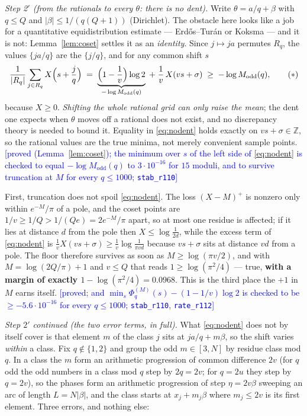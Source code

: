 \documentclass[11pt,a4paper]{article}
\theoremstyle{plain}
\theoremstyle{definition}
\theoremstyle{remark}
\newcommand{\STATUS}[1]{\textcolor{blue}{\textsf{[#1]}}}
\begin{document}
\emph{Step 2$'$ (from the rationals to every $\theta$: there is no dent).} Write
$\theta=a/q+\beta$ with $q\le Q$ and $|\beta|\le1/(q(Q+1))$ (Dirichlet). The obstacle here looks
like a job for a quantitative equidistribution estimate --- Erd\H{o}s--Tur\'an or Koksma --- and
it is not: Lemma~\ref{lem:coset} settles it as an \emph{identity}. Since $j\mapsto ja$ permutes
$R_q$, the values $\{ja/q\}$ are the $\{j/q\}$, and for any common shift $s$
\[
   \frac1{|R_q|}\sum_{j\in R_q}X\Bigl(s+\frac jq\Bigr)
   \;=\;\underbrace{\Bigl(1-\frac1v\Bigr)\log2}_{-\log M_{\mathrm{odd}}(q)}
   \;+\;\frac1v\,X(vs+\sigma)\;\ge\;-\log M_{\mathrm{odd}}(q),
   \tag{$\ast$}\label{eq:nodent}
\]
because $X\ge0$. \emph{Shifting the whole rational grid can only raise the mean}; the dent one
expects when $\theta$ moves off a rational does not exist, and no discrepancy theory is needed
to bound it. Equality in \eqref{eq:nodent} holds exactly on $vs+\sigma\in\mathbb Z$, so the
rational values are the true minima, not merely convenient sample points.
\STATUS{proved (Lemma~\ref{lem:coset}); the minimum over $s$ of the left side of
\eqref{eq:nodent} is checked to equal $-\log M_{\mathrm{odd}}(q)$ to $3\cdot10^{-16}$ for
$15$ moduli, and to survive truncation at $M$ for every $q\le1000$; \texttt{stab\_r110}}

First, truncation does not spoil \eqref{eq:nodent}. The loss $(X-M)^{+}$ is nonzero only within
$e^{-M}/\pi$ of a pole, and the coset points are $1/v\ge1/Q>1/(Qe)=2e^{-M}/\pi$ apart, so at most
one residue is affected; if it lies at distance $d$ from the pole then
$X\le\log\frac1{2d}$, while the excess term of \eqref{eq:nodent} is
$\tfrac1vX(vs+\sigma)\ge\tfrac1v\log\frac1{\pi vd}$ because $vs+\sigma$ sits at distance $vd$ from
a pole. The floor therefore survives as soon as $M\ge\log(\pi v/2)$, and with $M=\log(2Q/\pi)+1$
and $v\le Q$ that reads $1\ge\log(\pi^2/4)$ --- true, \textbf{with a margin of exactly
$1-\log(\pi^2/4)=0.0968$}. This is the third place the $+1$ in $M$ earns itself.
\STATUS{proved; and $\min_s\Phi^{(M)}_q(s)-(1-1/v)\log2$ is checked to be $\ge-5.6\cdot10^{-16}$
for every $q\le1000$; \texttt{stab\_r110}, \texttt{rate\_r112}}

\emph{Step $2'$ continued (the two error terms, in full).} What \eqref{eq:nodent} does not by
itself cover is that element $m$ of the class $j$ sits at $ja/q+m\beta$, so the shift varies
\emph{within} a class. Fix $q\notin\{1,2\}$ and group the odd $m\in[3,N]$ by residue class mod
$q$. In a class the $m$ form an arithmetic progression of common difference $2v$ (for $q$ odd the
odd numbers in a class mod $q$ step by $2q=2v$; for $q=2u$ they step by $q=2v$), so the phases
form an arithmetic progression of step $\eta=2v\beta$ sweeping an arc of length $L=N|\beta|$, and
the class starts at $x_j+m_j\beta$ where $m_j\le 2v$ is its first element. Three errors, and
nothing else:
\end{document}
